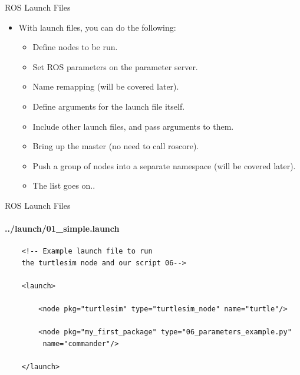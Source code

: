 \documentclass{beamer}
\begin{document}
\begin{frame}{ROS Launch Files}
    \begin{itemize}        
        \item With launch files, you can do the following:
        \begin{itemize}
            \item Define nodes to be run.
            
            \item Set ROS parameters on the parameter server.
            
            \item Name remapping (will be covered later).
            
            \item Define arguments for the launch file itself.
            
            \item Include other launch files, and pass arguments to them.
            
            \item Bring up the master (no need to call {\ttfamily \colorbox{gray!30!white}{roscore}}).
            
            \item Push a group of nodes into a separate namespace (will be covered later).
           
             \item The list goes on..          
           \end{itemize} 

        
    \end{itemize}  
\end{frame}


\begin{frame}[fragile]{ROS Launch Files}
    \framesubtitle{../launch/01\_simple.launch}
    \begin{lstlisting}
    <!-- Example launch file to run 
    the turtlesim node and our script 06-->
    
    <launch>
    
        <node pkg="turtlesim" type="turtlesim_node" name="turtle"/>
        
        <node pkg="my_first_package" type="06_parameters_example.py" 
         name="commander"/>
    
    </launch>
    \end{lstlisting}
\end{frame}
\end{document}
